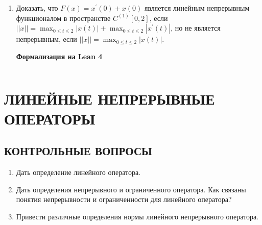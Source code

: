 \documentclass[12pt,a4paper]{article}
\begin{document}
\begin{enumerate}
\newpage
\item Доказать, что $F(x) = x^{\prime}(0) + x(0)$ является линейным непрерывным функционалом в пространстве $C^{(1)}[0,2]$, если $||x|| = \max_{0 \le t \le 2} |x(t)| + \max_{0 \le t \le 2} |x^{\prime}(t)|$, но не является непрерывным, если $||x|| = \max_{0 \le t \le 2} |x(t)|$.

\begin{center}\small\textbf{Формализация на Lean 4}\end{center}
\inputminted{lean}{FunAn/Section13_LinearFunctionals/Task04.lean}

\end{enumerate}

\section{ЛИНЕЙНЫЕ НЕПРЕРЫВНЫЕ ОПЕРАТОРЫ}

\subsection*{КОНТРОЛЬНЫЕ ВОПРОСЫ}
\begin{enumerate}
\item Дать определение линейного оператора.
\item Дать определения непрерывного и ограниченного оператора. Как связаны понятия непрерывности и ограниченности для линейного оператора?
\item Привести различные определения нормы линейного непрерывного оператора.
\end{enumerate}
\end{document}
